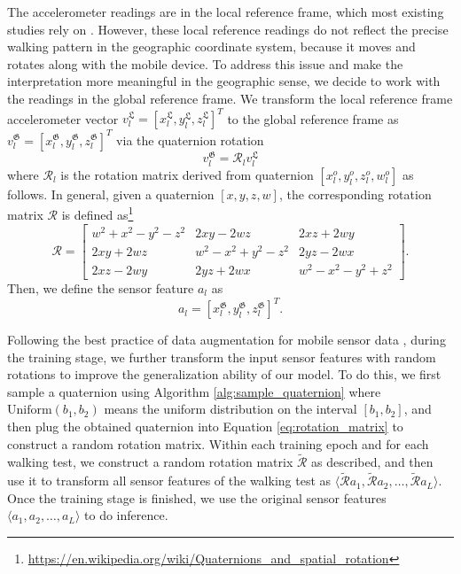 \begin{appendices}
The accelerometer readings are in the local reference frame, which most existing studies rely on \protect\cite{piau_when_2020_a,yu_wearable_2022_a,zhu_deep_2021_a}. However, these local reference readings do not reflect the precise walking pattern in the geographic coordinate system, because it moves and rotates along with the mobile device. To address this issue and make the interpretation more meaningful in the geographic sense, we decide to work with the readings in the global reference frame. We transform the local reference frame accelerometer vector $v_l^{\mathfrak{L}} =[x_l^{\mathfrak{L}},y_l^{\mathfrak{L}},z_l^{\mathfrak{L}}]^T$ to the global reference frame as $v_l^\mathfrak{G} =[x_l^{\mathfrak{G}},y_l^{\mathfrak{G}},z_l^{\mathfrak{G}}]^T$ via the quaternion rotation 
$$v_l^{\mathfrak{G}} = \mathcal{R}_l v_l^{\mathfrak{L}}$$ 
where $\mathcal{R}_l$ is the rotation matrix derived from quaternion $[x_l^{o},y_l^{o},z_l^{o},w_l^{o}]$ as follows. In general, given a quaternion $[x,y,z,w]$, the corresponding rotation matrix $\mathcal{R}$ is defined as\footnote{\url{https://en.wikipedia.org/wiki/Quaternions_and_spatial_rotation}}
\begin{equation}
\label{eq:rotation_matrix}
    \mathcal{R} = \begin{bmatrix}
        w^2+x^2-y^2-z^2 & 2 x y-2w z & 2 x z+2 w y \\  
        2 x y+2 w z & w^2-x^2+y^2-z^2 & 2 y z-2w x \\
        2 x z-2w y & 2 y z + 2 w x & w^2 - x^2- y^2 + z^2
    \end{bmatrix}.
\end{equation}
Then, we define the sensor feature $a_l$ as
\begin{equation}
a_{l}=[x_l^{\mathfrak{G}},y_l^{\mathfrak{G}},z_l^{\mathfrak{G}} ]^T.
\end{equation}

Following the best practice of data augmentation for mobile sensor data , during the training stage, we further transform the input sensor features with random rotations to improve the generalization ability of our model. To do this, we first sample a quaternion using Algorithm \ref{alg:sample_quaternion} where $\text{Uniform}(b_1,b_2)$ means the uniform distribution on the interval $[b_1,b_2]$, and then plug the obtained quaternion into Equation \ref{eq:rotation_matrix} to construct a random rotation matrix. Within each training epoch and for each walking test, we construct a random rotation matrix $\tilde{\mathcal{R}}$ as described, and then use it to transform all sensor features of the walking test as $\langle \tilde{\mathcal{R}} a_1, \tilde{\mathcal{R}} a_2, \dots, \tilde{\mathcal{R}} a_L \rangle$. Once the training stage is finished, we use the original sensor features $\langle a_1, a_2, \dots, a_L \rangle$ to do inference.


\end{appendices}
